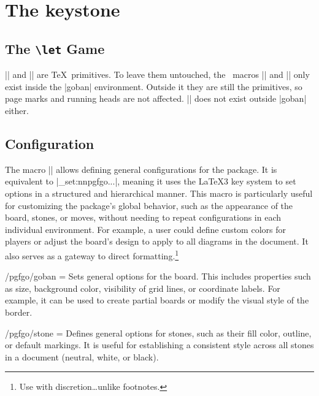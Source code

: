 \section{The keystone}

\subsection{The \texttt{\textbackslash let} Game}

|\mark| and |\marks| are \TeX\ primitives. To leave them untouched, the \pgfgoname\ macros |\mark| and |\marks| only exist inside the |goban| environment. Outside it they are still the primitives, so page marks and running heads are not affected. |\sgf| does not exist outside |goban| either.

\subsection{Configuration}

The macro || allows defining general configurations for the package. It is equivalent to |\keys_set:nn{pgfgo}{...}|, meaning it uses the LaTeX3 key system to set options in a structured and hierarchical manner. This macro is particularly useful for customizing the package's global behavior, such as the appearance of the board, stones, or moves, without needing to repeat configurations in each individual environment. For example, a user could define custom colors for players or adjust the board's design to apply to all diagrams in the document. It also serves as a gateway to direct formatting.\footnote{Use with discretion\dots unlike footnotes.}

\begin{command}{\pgfgoset{}}
\end{command}

\begin{key}{/pgfgo/goban = }
	Sets general options for the board. This includes properties such as size, background color, visibility of grid lines, or coordinate labels. For example, it can be used to create partial boards or modify the visual style of the border.
\end{key}

\begin{key}{/pgfgo/stone = }
	Defines general options for stones, such as their fill color, outline, or default markings. It is useful for establishing a consistent style across all stones in a document (neutral, white, or black).
\end{key}

